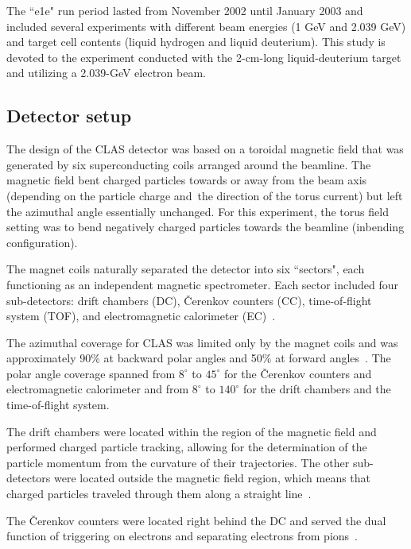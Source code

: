 \documentclass[prc,twocolumn,superscriptaddress,showpacs,amssymb,amsmath,amsfonts,aps,nofootinbib]{revtex4-1}
\begin{document}
The ``e1e" run period lasted from November 2002 until January 2003 and included several experiments with different beam energies (1 GeV and 2.039 GeV) and target cell contents (liquid hydrogen and liquid deuterium). This study is devoted to the experiment conducted with the 2-cm-long liquid-deuterium target and utilizing a 2.039-GeV electron beam. 

\subsection{Detector setup}

The design of the CLAS detector was based on a toroidal magnetic field that was generated by six superconducting coils arranged around the beamline. The magnetic field bent charged particles towards or away from the beam axis (depending on the particle charge and~the direction of the torus current) but left the azimuthal angle essentially unchanged. For this experiment, the torus field setting was to bend negatively charged particles towards the beamline (inbending configuration).

The magnet coils naturally separated the detector into six ``sectors", each functioning as an independent magnetic spectrometer. Each sector included four sub-detectors: drift chambers (DC), \v Cerenkov counters (CC), time-of-flight system (TOF), and electromagnetic calorimeter (EC)~\cite{Mecking:2003zu}.


The azimuthal coverage for CLAS was limited only by the magnet coils and was approximately 90\% at backward polar angles and 50\% at forward angles~\cite{Amarian:2001zs}. The polar angle coverage spanned from $8^{\circ}\mathrm{}$ to $45^{\circ}\mathrm{}$ for the \v Cerenkov counters and electromagnetic calorimeter and from $8^{\circ}\mathrm{}$ to $140^{\circ}\mathrm{}$ for the drift chambers and the time-of-flight system.

The drift chambers were located within the region of the magnetic field and performed charged particle tracking, allowing for the determination of the particle momentum from the curvature of their trajectories. The other sub-detectors were located outside the magnetic field region, which means that charged particles traveled through them along a straight line~\cite{Mestayer:2000we}.

The \v Cerenkov counters were located right behind the DC and served the dual function of triggering on electrons and separating electrons from pions~\cite{Adams:2001kk}. 
\end{document}
